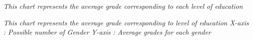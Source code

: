 \documentclass[a4paper,12pt,oneside]{sphinxmanual}
\begin{document}
\emph{This chart represents the average grade corresponding to each level of education}
\begin{figure}[htbp]
\centering

\end{figure}

\emph{This chart represents the average grade corresponding to level of education}
\emph{X-axis : Possible number of Gender}
\emph{Y-axis : Average grades for each gender}
\end{document}
